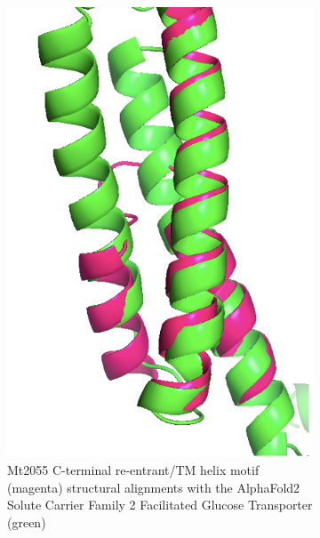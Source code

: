 \begin{figure}[htb]
    \centering %
\begin{subfigure}{0.3\textwidth}
  \includegraphics[width=\linewidth]{Pfam/slc2.png}
  \caption{Mt2055 C-terminal re-entrant/TM helix motif (magenta) structural alignments with the AlphaFold2 Solute Carrier Family 2 Facilitated Glucose Transporter (green)}
  \label{fig:false_pos}
\end{subfigure}\hfil %
\begin{subfigure}{0.3\textwidth}

\end{subfigure}
\end{figure}
